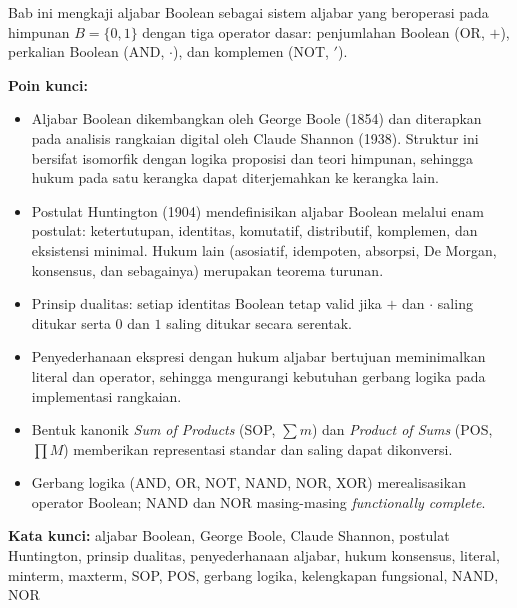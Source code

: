 \documentclass[../main]{subfiles}
\begin{document}

\begin{rangkuman}
Bab ini mengkaji aljabar Boolean sebagai sistem aljabar yang beroperasi pada himpunan $B = \{0, 1\}$ dengan tiga operator dasar: penjumlahan Boolean (OR, $+$), perkalian Boolean (AND, $\cdot$), dan komplemen (NOT, $'$).

\textbf{Poin kunci:}
\begin{itemize}
  \item Aljabar Boolean dikembangkan oleh George Boole (1854) dan diterapkan pada analisis rangkaian digital oleh Claude Shannon (1938). Struktur ini bersifat isomorfik dengan logika proposisi dan teori himpunan, sehingga hukum pada satu kerangka dapat diterjemahkan ke kerangka lain.
  \item Postulat Huntington (1904) mendefinisikan aljabar Boolean melalui enam postulat: ketertutupan, identitas, komutatif, distributif, komplemen, dan eksistensi minimal. Hukum lain (asosiatif, idempoten, absorpsi, De Morgan, konsensus, dan sebagainya) merupakan teorema turunan.
  \item Prinsip dualitas: setiap identitas Boolean tetap valid jika $+$ dan $\cdot$ saling ditukar serta $0$ dan $1$ saling ditukar secara serentak.
  \item Penyederhanaan ekspresi dengan hukum aljabar bertujuan meminimalkan literal dan operator, sehingga mengurangi kebutuhan gerbang logika pada implementasi rangkaian.
  \item Bentuk kanonik \textit{Sum of Products} (SOP, $\sum m$) dan \textit{Product of Sums} (POS, $\prod M$) memberikan representasi standar dan saling dapat dikonversi.
  \item Gerbang logika (AND, OR, NOT, NAND, NOR, XOR) merealisasikan operator Boolean; NAND dan NOR masing-masing \textit{functionally complete}.
\end{itemize}

\textbf{Kata kunci:} aljabar Boolean, George Boole, Claude Shannon, postulat Huntington, prinsip dualitas, penyederhanaan aljabar, hukum konsensus, literal, minterm, maxterm, SOP, POS, gerbang logika, kelengkapan fungsional, NAND, NOR
\end{rangkuman}

\ifSubfilesClassLoaded{
  \renewcommand{\bibname}{Daftar Pustaka}
  
  
}{}
\end{document}
